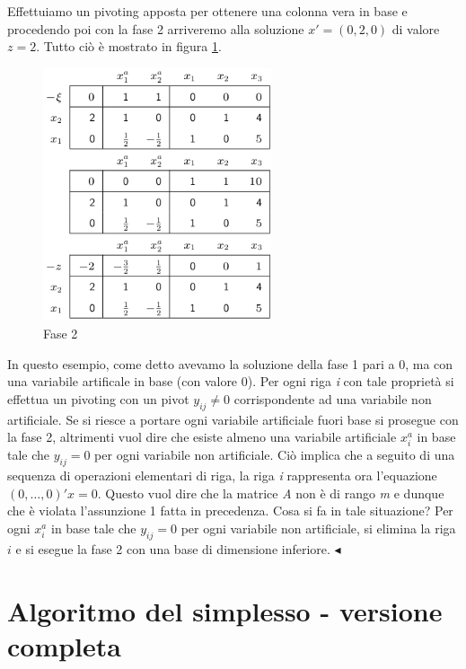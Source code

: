 \documentclass[11pt]{book}
\begin{document}
Effettuiamo un pivoting apposta per ottenere una colonna vera in base
e procedendo poi con la fase 2 arriveremo alla soluzione $x' =
(0,2,0)$ di valore $z = 2$. Tutto ci\`o \`e mostrato in figura
\ref{cap4fase2es3}. 

\begin{figure}[h!]
  \centering
  \includegraphics[width=0.6\textwidth]{images/cap4fase2es3.png}
  \caption{Fase 2}
  \label{cap4fase2es3}
\end{figure}

In questo esempio, come detto avevamo la soluzione della fase 1 pari a
0, ma con una variabile artificale in base (con valore 0). Per ogni
riga {\em i} con tale propriet\`a si effettua un pivoting con un pivot
$y_{ij} \neq 0$ corrispondente ad una variabile non artificiale. Se si
riesce a portare ogni variabile artificiale fuori base si prosegue con
la fase 2, altrimenti vuol dire che esiste almeno una variabile
artificiale $x_i^a$ in base tale che $y_{ij} = 0$ per ogni variabile
non artificiale. Ci\`o implica che a seguito di una sequenza di
operazioni elementari di riga, la riga {\em i} rappresenta ora
l'equazione $(0,\dots,0)'x = 0$. Questo vuol dire che la matrice {\em
  A} non \`e di rango {\em m} e dunque che \`e violata l'assunzione 1
fatta in precedenza. Cosa si fa in tale situazione? Per ogni $x_i^a$
in base tale che $y_{ij} = 0$ per ogni variabile non artificiale, si
elimina la riga $i$ e si esegue la fase 2 con una base di dimensione
inferiore.  $\blacktriangleleft$
\vspace{11pt}

\section{Algoritmo del simplesso - versione completa}
\end{document}
